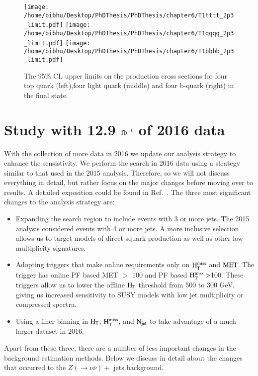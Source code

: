 \begin{figure}[h]
\centering
\texttt{[image: /home/bibhu/Desktop/PhDThesis/PhDThesis/chapter6/T1tttt\_2p3\_limit.pdf]}
\texttt{[image: /home/bibhu/Desktop/PhDThesis/PhDThesis/chapter6/T1qqqq\_2p3\_limit.pdf]}
\texttt{[image: /home/bibhu/Desktop/PhDThesis/PhDThesis/chapter6/T1bbbb\_2p3\_limit.pdf]}
\caption{\label{fig:Limit2015}The 95\% CL upper limits on the production cross sections for four top quark (left),four light quark (middle) and four b-quark (right) in the final state. }
\end{figure}



\section{Study with 12.9 $\bf \rm fb^{-1}$ of 2016 data}

With the collection of more data in 2016 we update our analysis strategy to enhance the sensistivity. We perform the search in 2016 data using a strategy similar to that used in the 2015 analysis. Therefore, so we will not discuss everything in detail, but rather focus on the major changes before moving over to results. A detailed exposition could be found in Ref.~\cite{CMS-PAS-SUS-16-014}. The three most significant changes to the analysis strategy are:
\begin{itemize}
\item Expanding the search region to include events with 3 or more
  jets. The 2015 analysis considered events with 4 or more
  jets. A more inclusive selection allows us to target  models
  of direct squark production as well as other low-multiplicity signatures.
\item Adopting triggers that make online requirements only on $\rm H_{T}^{miss}$
  and $\rm MET$. The trigger has online PF based MET $>$ 100 and PF based $\rm H_{T}^{miss} > $100.
  These triggers allow us to lower the offline $\rm H_{T}$ threshold from 500 to 300 GeV, giving us increased
  sensitivity to SUSY models with low jet multiplicity or compressed
  spectra.
\item Using a finer binning in $\rm H_{T}$, $\rm H_{T}^{miss}$,
and $\rm N_{jet}$ to take advantage of a much larger dataset in 2016.
\end{itemize}

Apart from these three, there are a number of less important changes in the  background estimation methods. Below we discuss in detail about the changes that occurred to the $Z(\rightarrow \nu \bar{\nu})+$ jets background.


